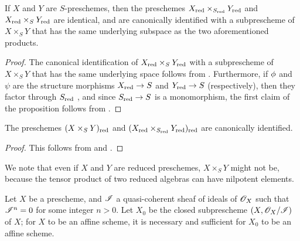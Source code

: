\begin{prop}[5.1.7]
\label{1.5.1.7}
If $X$ and $Y$ are $S$-preschemes, then the preschemes $X_{\mathrm{red}}\times_{S_{\mathrm{red}}}Y_{\mathrm{red}}$ and $X_{\mathrm{red}}\times_S Y_{\mathrm{red}}$ are identical, and are canonically identified with a subprescheme of $X\times_S Y$ that has the same underlying subspace as the two aforementioned products.
\end{prop}

\begin{proof}
\label{proof-1.5.1.7}
The canonical identification of $X_{\mathrm{red}}\times_S Y_{\mathrm{red}}$ with a subprescheme of $X\times_S Y$ that has the same underlying space follows from .
Furthermore, if $\phi$ and $\psi$ are the structure morphisms $X_\red\to S$ and $Y_\red\to S$ (respectively), then they factor through $S_{\mathrm{red}}$ , and since $S_\red\to S$ is a monomorphism, the first claim of the proposition follows from .
\end{proof}

\begin{cor}[5.1.8]
\label{1.5.1.8}
The preschemes $(X\times_S Y)_{\mathrm{red}}$ and $(X_{\mathrm{red}}\times_{S_{\mathrm{red}}}Y_{\mathrm{red}})_{\mathrm{red}}$ are canonically identified.
\end{cor}

\begin{proof}
\label{proof-1.5.1.8}
This follows from  and .
\end{proof}

We note that even if $X$ and $Y$ are reduced preschemes, $X\times_S Y$ might not be, because the tensor product of two reduced algebras can have nilpotent elements.

\begin{prop}[5.1.9]
\label{1.5.1.9}
Let $X$ be a prescheme, and $\mathscr{I}$ a quasi-coherent sheaf of ideals of $\mathscr{O}_X$ such that $\mathscr{I}^n=0$ for some integer $n>0$.
Let $X_0$ be the closed subprescheme $(X,\mathscr{O}_X/\mathscr{I})$ of $X$;
for $X$ to be an affine scheme, it is necessary and sufficient for $X_0$ to be an affine scheme.
\end{prop}

